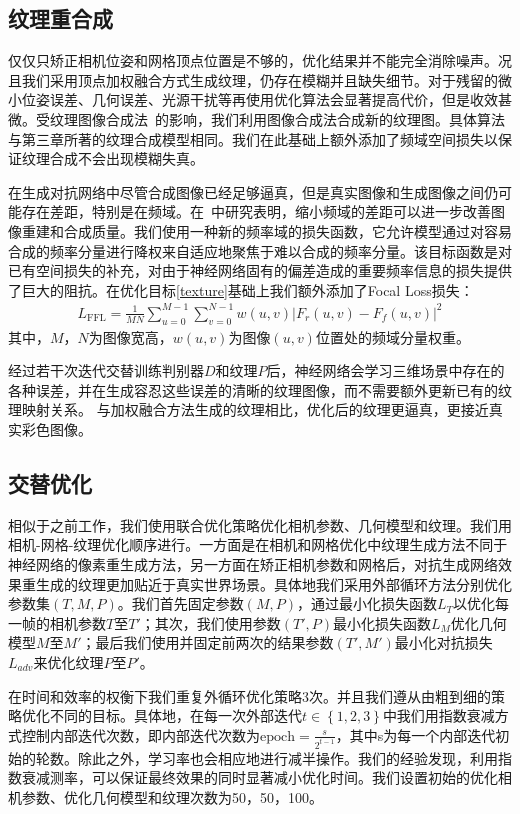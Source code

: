 \subsection{纹理重合成}
仅仅只矫正相机位姿和网格顶点位置是不够的，优化结果并不能完全消除噪声。况且我们采用顶点加权融合方式生成纹理，仍存在模糊并且缺失细节。对于残留的微小位姿误差、几何误差、光源干扰等再使用优化算法会显著提高代价，但是收效甚微。受纹理图像合成法~\cite{bi2017patch,JingweiHuang2020AdversarialTO}的影响，我们利用图像合成法合成新的纹理图。具体算法与第三章所著的纹理合成模型相同。我们在此基础上额外添加了频域空间损失以保证纹理合成不会出现模糊失真。\par

在生成对抗网络中尽管合成图像已经足够逼真，但是真实图像和生成图像之间仍可能存在差距，特别是在频域。在~\cite{jiang2021focal}中研究表明，缩小频域的差距可以进一步改善图像重建和合成质量。我们使用一种新的频率域的损失函数，它允许模型通过对容易合成的频率分量进行降权来自适应地聚焦于难以合成的频率分量。该目标函数是对已有空间损失的补充，对由于神经网络固有的偏差造成的重要频率信息的损失提供了巨大的阻抗。在优化目标\eqref{texture}基础上我们额外添加了Focal Loss损失：
\begin{align}
	L_\mathrm{FFL}=\frac{1}{M N} \sum_{u=0}^{M-1} \sum_{v=0}^{N-1} w(u, v)\left|F_{r}(u, v)-F_{f}(u, v)\right|^{2}
\end{align}
其中，$M，N$为图像宽高，$w(u, v)$为图像$(u,v)$位置处的频域分量权重。\par
经过若干次迭代交替训练判别器$D$和纹理$P$后，神经网络会学习三维场景中存在的各种误差，并在生成容忍这些误差的清晰的纹理图像，而不需要额外更新已有的纹理映射关系。 与加权融合方法生成的纹理相比，优化后的纹理更逼真，更接近真实彩色图像。\par

\subsection{交替优化}
相似于之前工作，我们使用联合优化策略优化相机参数、几何模型和纹理。我们用相机-网格-纹理优化顺序进行。一方面是在相机和网格优化中纹理生成方法不同于神经网络的像素重生成方法，另一方面在矫正相机参数和网格后，对抗生成网络效果重生成的纹理更加贴近于真实世界场景。具体地我们采用外部循环方法分别优化参数集$(T,M,P)$。我们首先固定参数$(M,P)$，通过最小化损失函数$L_T$以优化每一帧的相机参数$T$至$T'$；其次，我们使用参数$(T',P)$最小化损失函数$L_M$优化几何模型$M$至$M'$；最后我们使用并固定前两次的结果参数$(T',M')$最小化对抗损失$L_{adv}$来优化纹理$P$至$P'$。\par
在时间和效率的权衡下我们重复外循环优化策略3次。并且我们遵从由粗到细的策略优化不同的目标。具体地，在每一次外部迭代$t\in \left \{ 1,2,3 \right \}$中我们用指数衰减方式控制内部迭代次数，即内部迭代次数为$\text{epoch}  =\frac{s}{2^{t-1}}$，其中s为每一个内部迭代初始的轮数。除此之外，学习率也会相应地进行减半操作。我们的经验发现，利用指数衰减测率，可以保证最终效果的同时显著减小优化时间。我们设置初始的优化相机参数、优化几何模型和纹理次数为50，50，100。

